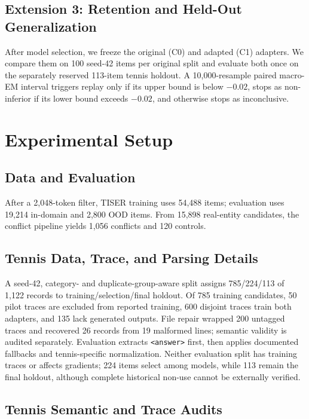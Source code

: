 \documentclass[conference]{IEEEtran}
\begin{document}
\subsection{Extension 3: Retention and Held-Out Generalization}

After model selection, we freeze the original (C0) and adapted (C1) adapters. We compare them on 100 seed-42 items per original split and evaluate both once on the separately reserved 113-item tennis holdout. A 10,000-resample paired macro-EM interval triggers replay only if its upper bound is below $-0.02$, stops as non-inferior if its lower bound exceeds $-0.02$, and otherwise stops as inconclusive.

\section{Experimental Setup}
\label{sec:experimental-setup}

\subsection{Data and Evaluation}

After a 2,048-token filter, TISER training uses 54,488 items; evaluation uses 19,214 in-domain and 2,800 OOD items. From 15,898 real-entity candidates, the conflict pipeline yields 1,056 conflicts and 120 controls.

\subsection{Tennis Data, Trace, and Parsing Details}

A seed-42, category- and duplicate-group-aware split assigns 785/224/113 of 1,122 records to training/selection/final holdout. Of 785 training candidates, 50 pilot traces are excluded from reported training, 600 disjoint traces train both adapters, and 135 lack generated outputs. File repair wrapped 200 untagged traces and recovered 26 records from 19 malformed lines; semantic validity is audited separately. Evaluation extracts \texttt{<answer>} first, then applies documented fallbacks and tennis-specific normalization. Neither evaluation split has training traces or affects gradients; 224 items select among models, while 113 remain the final holdout, although complete historical non-use cannot be externally verified.

\subsection{Tennis Semantic and Trace Audits}
\end{document}
